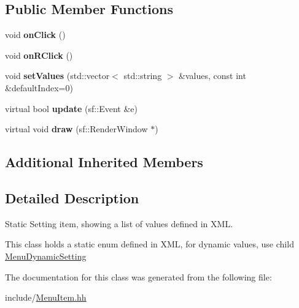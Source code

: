 \subsection*{Public Member Functions}
\begin{DoxyCompactItemize}
\item 
void {\bfseries on\+Click} ()\hypertarget{classMenuSetting_a3523379d8365f4e279a56b207af16e27}{}\label{classMenuSetting_a3523379d8365f4e279a56b207af16e27}

\item 
void {\bfseries on\+R\+Click} ()\hypertarget{classMenuSetting_a274d6e7a797c740e067076c34d45aa88}{}\label{classMenuSetting_a274d6e7a797c740e067076c34d45aa88}

\item 
void {\bfseries set\+Values} (std\+::vector$<$ std\+::string $>$ \&values, const int \&default\+Index=0)\hypertarget{classMenuSetting_a3dccb3c68004de95ed966f5e5a1cdaf9}{}\label{classMenuSetting_a3dccb3c68004de95ed966f5e5a1cdaf9}

\item 
virtual bool {\bfseries update} (sf\+::\+Event \&e)\hypertarget{classMenuSetting_abb6588ebbf8ab936a24f96230df2444d}{}\label{classMenuSetting_abb6588ebbf8ab936a24f96230df2444d}

\item 
virtual void {\bfseries draw} (sf\+::\+Render\+Window $\ast$)\hypertarget{classMenuSetting_a3caa70f4bb68558fa73eaf356801679e}{}\label{classMenuSetting_a3caa70f4bb68558fa73eaf356801679e}

\end{DoxyCompactItemize}
\subsection*{Additional Inherited Members}


\subsection{Detailed Description}
Static Setting item, showing a list of values defined in X\+ML. 

This class holds a static enum defined in X\+ML, for dynamic values, use child \hyperlink{classMenuDynamicSetting}{Menu\+Dynamic\+Setting} 

The documentation for this class was generated from the following file\+:\begin{DoxyCompactItemize}
\item 
include/\hyperlink{MenuItem_8hh}{Menu\+Item.\+hh}\end{DoxyCompactItemize}
